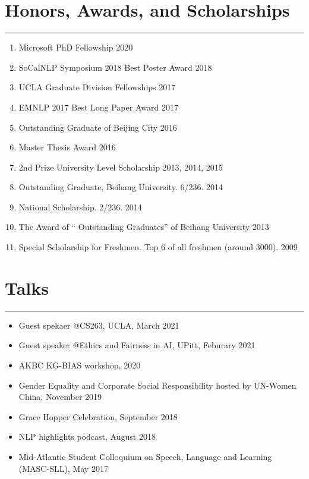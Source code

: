 \documentclass[11pt, a4paper]{article}
\newcommand{\hr}{\hrule\vspace{0.5em}}
\begin{document}
\section*{Honors, Awards, and Scholarships}
\hr
\begin{enumerate}
\item Microsoft PhD Fellowship \hfill 2020
\item SoCalNLP Symposium 2018 Best Poster Award \hfill 2018
\item UCLA Graduate Division Fellowships \hfill 2017
\item EMNLP 2017 Best Long Paper Award \hfill 2017
\item Outstanding Graduate of Beijing City \hfill 2016
\item Master Thesis Award \hfill 2016
\item 2nd Prize University Level Scholarship \hfill 2013, 2014, 2015
\item Outstanding Graduate, Beihang University. 6/236.	 \hfill 2014
\item National Scholarship. 2/236. \hfill 2014
\item The Award of `` Outstanding Graduates'' of Beihang University \hfill 2013
\item Special Scholarship for Freshmen. Top 6 of all freshmen (around 3000). \hfill 2009

\end{enumerate}


\section*{Talks}
\hr
\begin{itemize}
\item Guest spekaer @CS263, UCLA, March 2021
\item Guest speaker @Ethics and Fairness in AI, UPitt,  Feburary 2021
\item AKBC KG-BIAS workshop, 2020
\item Gender Equality and Corporate Social Responsibility hosted by UN-Women China, November 2019 
\item Grace Hopper Celebration, September 2018
\item NLP highlights podcast, August 2018
\item Mid-Atlantic Student Colloquium on Speech, Language and Learning (MASC-SLL), May 2017
\end{itemize}
\end{document}
